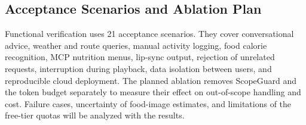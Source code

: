 

\subsection{Acceptance Scenarios and Ablation Plan}
Functional verification uses 21 acceptance scenarios. They cover conversational advice, weather and route queries, manual activity logging, food calorie recognition, MCP nutrition menus, lip-sync output, rejection of unrelated requests, interruption during playback, data isolation between users, and reproducible cloud deployment. The planned ablation removes ScopeGuard and the token budget separately to measure their effect on out-of-scope handling and cost. Failure cases, uncertainty of food-image estimates, and limitations of the free-tier quotas will be analyzed with the results.
